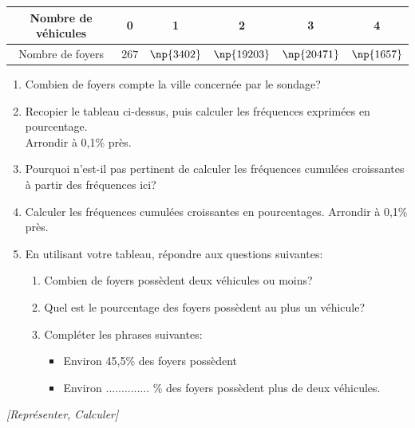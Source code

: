 \begin{center}
\begin{tabular}{*{6}{|c}|}
\hline
Nombre de véhicules &  0 & 1 & 2& 3& 4 \tabularnewline
\hline
Nombre de foyers & $267$& $\np{3402}$ & $\np{19203}$ & $\np{20471}$ & $\np{1657}$ \tabularnewline
\hline
\end{tabular}
\end{center}

\begin{enumerate}
\item Combien de foyers compte la ville concernée par le sondage?
\item Recopier le tableau ci-dessus, puis calculer les fréquences exprimées en pourcentage. \\ Arrondir à 0,1\% près.
\item Pourquoi n'est-il pas pertinent de calculer les fréquences cumulées croissantes à partir des fréquences ici?
\item  Calculer les fréquences cumulées croissantes en pourcentages. Arrondir à 0,1\% près.
\item En utilisant votre tableau, répondre aux questions suivantes:
\begin{enumerate}
\item Combien de foyers possèdent deux véhicules ou moins?
\item Quel est le pourcentage des foyers possèdent au plus un véhicule?
\item Compléter les phrases suivantes:
\begin{itemize}
\item Environ 45,5\% des foyers possèdent \dotfill 
\item Environ .............. \% des foyers possèdent plus de deux véhicules. 
\end{itemize}
\end{enumerate}
\end{enumerate}


\exo \textit{[Représenter, Calculer]}



